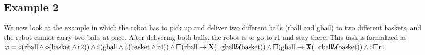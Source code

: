 \subsection{Example 2}
We now look at the example \cite{guo15} in which the robot has to pick up and deliver two different balls (rball and gball) to two different baskets, and the robot cannot carry two balls at once. After delivering both balls, the robot is to go to r1 and stay there. This task is formalized as $\varphi = \diamond (\text{rball} \wedge \diamond (\text{basket} \wedge \text{r2})) \wedge \diamond(\text{gball} \wedge \diamond (\text{basket} \wedge \text{r4})) \wedge \square (\text{rball} \rightarrow \textbf{X}(\neg \text{gball} \bm{\mathcal{U}} \text{basket})) \wedge \square (\text{gball} \rightarrow \textbf{X} (\neg \text{rball} \bm{\mathcal{U}} \text{basket})) \wedge \diamond \square \text{r1}$
